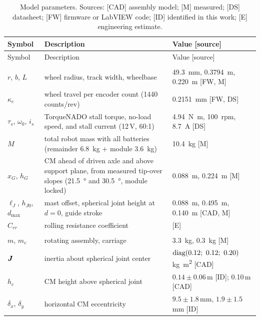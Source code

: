 \begin{small}
\begin{longtable}{@{}>{\raggedright\arraybackslash}p{}>{\raggedright\arraybackslash}p{}>{\raggedleft\arraybackslash}p{}@{}}
\caption{Model parameters. Sources: [CAD] assembly model; [M] measured; [DS] datasheet; [FW] firmware or LabVIEW code; [ID] identified in this work; [E] engineering estimate.}\label{tab:params}\\
\toprule
Symbol & Description & Value [source] \\
\midrule\endfirsthead
\toprule Symbol & Description & Value [source] \\ \midrule\endhead
\multicolumn{3}{@{}l}{\emph{Mobile base}}\\
$r$, $b$, $L$ & wheel radius, track width, wheelbase & \SI{49.3}{\milli\metre}, \SI{0.3794}{\metre}, \SI{0.220}{\metre} [FW, M] \\
$\kappa_e$ & wheel travel per encoder count (1440 counts/rev) & \SI{0.2151}{\milli\metre} [FW, DS] \\
$\tau_s$, $\omega_0$, $i_s$ & TorqueNADO stall torque, no-load speed, and stall current (12\,V, 60:1) & \SI{4.94}{\newton\metre}, \SI{100}{rpm}, \SI{8.7}{\ampere} [DS] \cite{pitsco_torquenado} \\
$M$ & total robot mass with all batteries (remainder \SI{6.8}{\kilo\gram} + module \SI{3.6}{\kilo\gram}) & \SI{10.4}{\kilo\gram} [M] \\
$x_G$, $h_G$ & CM ahead of driven axle and above support plane, from measured tip-over slopes (\SI{21.5}{\degree} and \SI{30.5}{\degree}, module locked) & \SI{0.088}{\metre}, \SI{0.224}{\metre} [M] \\
$\ell_J$, $h_{J0}$, $d_{\max}$ & mast offset, spherical joint height at $d=0$, guide stroke & \SI{0.088}{\metre}, \SI{0.495}{\metre}, \SI{0.140}{\metre} [CAD, M] \\
$C_{rr}$ & rolling resistance coefficient & 0.02 [E] \\
\midrule
\multicolumn{3}{@{}l}{\emph{Aerial module}}\\
$m$, $m_c$ & rotating assembly, carriage & \SI{3.3}{\kilo\gram}, \SI{0.3}{\kilo\gram} [M] \\
$\bm{J}$ & inertia about spherical joint center & $\diag(0.12;\ 0.12;\ 0.20)$\,\si{\kilo\gram\metre\squared} [CAD] \\
$h_c$ & CM height above spherical joint & $0.14\pm0.06$\,m [ID]; 0.10\,m [CAD] \\
$\delta_x$, $\delta_y$ & horizontal CM eccentricity & $9.5\pm1.8$\,mm, $1.9\pm1.5$\,mm [ID] \\

\end{longtable}
\end{small}
